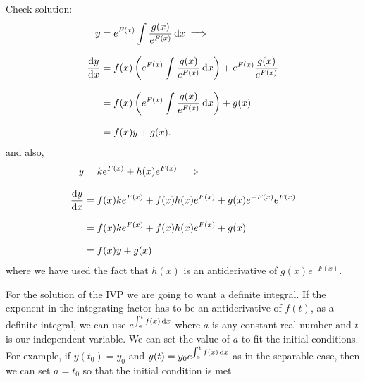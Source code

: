 \documentclass[../MathsNotesBase.tex]{subfiles}
\begin{document}
{		Check solution:
		\begin{align*}
			y &= e^{F(x)}\int \frac{g(x)}{e^{F(x)}} \dif x \implies \\[8pt]
			\frac{\dif y}{\dif x} &= f(x)\left(e^{F(x)}\int \frac{g(x)}{e^{F(x)}} \dif x\right) + e^{F(x)}\frac{g(x)}{e^{F(x)}} \\[8pt]
			&= f(x)\left(e^{F(x)}\int \frac{g(x)}{e^{F(x)}} \dif x\right) + g(x) \\[8pt]
			&= f(x)y + g(x).
		\end{align*}
		and also,
		\begin{align*}
			y &= k e^{F(x)} + h(x) e^{F(x)} \implies \\[8pt]
			\frac{\dif y}{\dif x} &= f(x) k e^{F(x)} + f(x) h(x) e^{F(x)} + g(x) e^{-F(x)} e^{F(x)} \\[8pt]
			&= f(x) k e^{F(x)} + f(x) h(x) e^{F(x)} + g(x) \\[8pt]
			&= f(x)y + g(x)
		\end{align*}
		where we have used the fact that $h(x)$ is an antiderivative of ${ g(x) e^{-F(x)} }$.
		
		\biggerskip
		For the solution of the IVP we are going to want a definite integral. If the exponent in the integrating factor has to be an antiderivative of $f(t)$, as a definite integral, we can use ${ e^{\int_a^t f(x) \dif x} }$ where $a$ is any constant real number and $t$ is our independent variable.
		We can set the value of $a$ to fit the initial conditions. For example, if ${ y(t_0) = y_0 }$ and ${ y(t) = y_0 e^{\int_a^t f(x) \dif x} }$ as in the separable case, then we can set ${ a = t_0 }$ so that the initial condition is met.\\
		
}
\end{document}
